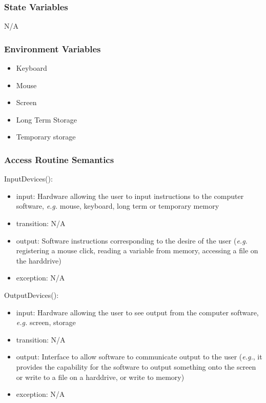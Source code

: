 \documentclass[12pt, titlepage]{article}
\begin{document}
\subsubsection{State Variables}
N/A

\subsubsection{Environment Variables}
\begin{itemize}
    \item Keyboard
    \item Mouse
    \item Screen
    \item Long Term Storage
    \item Temporary storage
\end{itemize}

\subsubsection{Access Routine Semantics}

\noindent InputDevices():
\begin{itemize}
    \item input: Hardware allowing the user to input instructions to the
    computer software, \textit{e.g.} mouse, keyboard, long term or temporary memory
    \item transition: N/A
    \item output: Software instructions corresponding to the desire of the user
    (\textit{e.g.} registering a mouse click, reading a variable from memory,
    accessing a file on the harddrive)
    \item exception: N/A
\end{itemize}

\noindent OutputDevices():
\begin{itemize}
    \item input: Hardware allowing the user to see output from the computer
    software, \textit{e.g.} screen, storage
    \item transition: N/A
    \item output: Interface to allow software to communicate output to the user
    (\textit{e.g.}, it provides the capability for the software to output something
    onto the screen or write to a file on a harddrive, or write to memory)
    \item exception: N/A
\end{itemize}
\end{document}
